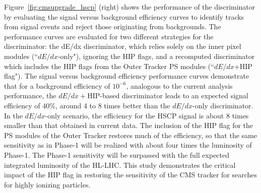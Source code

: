 Figure~\ref{fig:cmsupgrade_hscp} (right) shows the performance of the discriminator by evaluating the signal versus background
efficiency curves to identify tracks from signal events and reject those originating from backgrounds. The performance curves are evaluated for two different strategies for
the discriminator: the dE/dx discriminator, which relies solely on the inner pixel modules
(``$dE/dx$-only"), ignoring the HIP flags, and a recomputed discriminator which includes the
HIP flags from the Outer Tracker PS modules (``$dE/dx$+HIP flag"). The signal versus background
efficiency performance curves demonstrate that for a background efficiency
of $10^{-6}$, analogous to the current analysis performance, the $dE/dx+$HIP-based discriminator
leads to an expected signal efficiency of $40\%$, around 4 to 8 times better than the $dE/dx$-only
discriminator. In the $dE/dx$-only scenario, the efficiency for the HSCP signal is about 8 times
smaller than that obtained in current data. The inclusion of the HIP flag for the PS modules of the Outer Tracker restores much of the efficiency, so that the
same sensitivity as in Phase-1 will be realized with about four times the luminosity of Phase-1.
The Phase-1 sensitivity will be surpassed with the full expected integrated luminosity of the
HL-LHC. This study demonstrates the critical impact of the HIP flag in restoring the sensitivity
of the CMS tracker for searches for highly ionizing particles.

